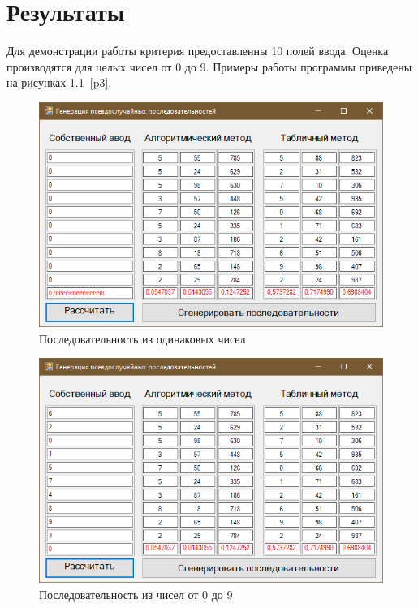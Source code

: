 \chapter{Результаты}
Для демонстрации работы критерия предоставленны 10 полей ввода. Оценка производятся для целых чисел от 0 до 9. Примеры работы программы приведены на рисунках \ref{p1}--\ref{p3}.

\begin{figure}[h]
	\includegraphics[width=1\linewidth]{inc/img/1.png}
	\caption{Последовательность из одинаковых чисел}
	\label{p1}
\end{figure}

\begin{figure}[h]
	\includegraphics[width=1\linewidth]{inc/img/2.png}
	\caption{Последовательность из чисел от 0 до 9}
	\label{p2}
\end{figure}

